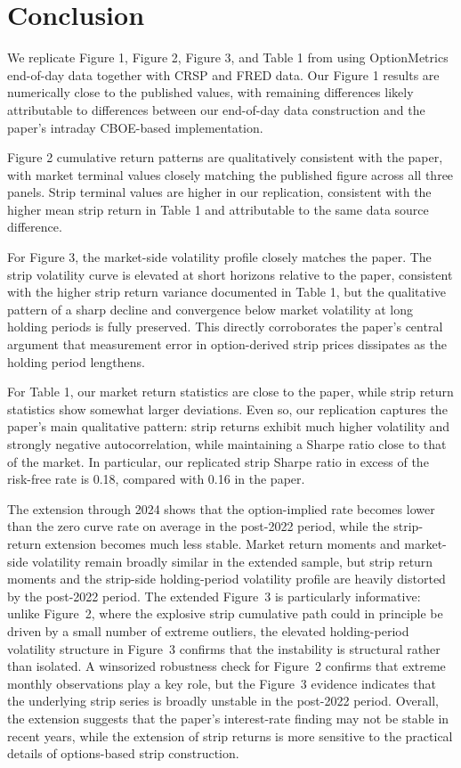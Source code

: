 \documentclass[12pt]{article}
\begin{document}
\section{Conclusion}

We replicate Figure 1, Figure 2, Figure 3, and Table 1 from \cite{golez2024holding}
using OptionMetrics end-of-day data together with CRSP and FRED data.
Our Figure 1 results are numerically close to the published values,
with remaining differences likely attributable to differences between
our end-of-day data construction and the paper's intraday CBOE-based implementation.

Figure 2 cumulative return patterns are qualitatively consistent with the paper,
with market terminal values closely matching the published figure across all three panels.
Strip terminal values are higher in our replication, consistent with the
higher mean strip return in Table 1 and attributable to the same data source difference.

For Figure 3, the market-side volatility profile closely matches the paper.
The strip volatility curve is elevated at short horizons relative to the paper,
consistent with the higher strip return variance documented in Table 1,
but the qualitative pattern of a sharp decline and convergence below market
volatility at long holding periods is fully preserved.
This directly corroborates the paper's central argument that measurement error
in option-derived strip prices dissipates as the holding period lengthens.

For Table 1, our market return statistics are close to the paper,
while strip return statistics show somewhat larger deviations.
Even so, our replication captures the paper's main qualitative pattern:
strip returns exhibit much higher volatility and strongly negative autocorrelation,
while maintaining a Sharpe ratio close to that of the market.
In particular, our replicated strip Sharpe ratio in excess of the risk-free rate
is 0.18, compared with 0.16 in the paper.

The extension through 2024 shows that the option-implied rate becomes lower than
the zero curve rate on average in the post-2022 period,
while the strip-return extension becomes much less stable.
Market return moments and market-side volatility remain broadly similar
in the extended sample, but strip return moments and the strip-side
holding-period volatility profile are heavily distorted by the post-2022 period.
The extended Figure~3 is particularly informative: unlike Figure~2, where
the explosive strip cumulative path could in principle be driven by a small
number of extreme outliers, the elevated holding-period volatility structure in
Figure~3 confirms that the instability is structural rather than isolated.
A winsorized robustness check for Figure~2 confirms that extreme monthly
observations play a key role, but the Figure~3 evidence indicates that the
underlying strip series is broadly unstable in the post-2022 period.
Overall, the extension suggests that the paper's interest-rate finding may
not be stable in recent years, while the extension of strip returns is more
sensitive to the practical details of options-based strip construction.

\newpage


\end{document}

